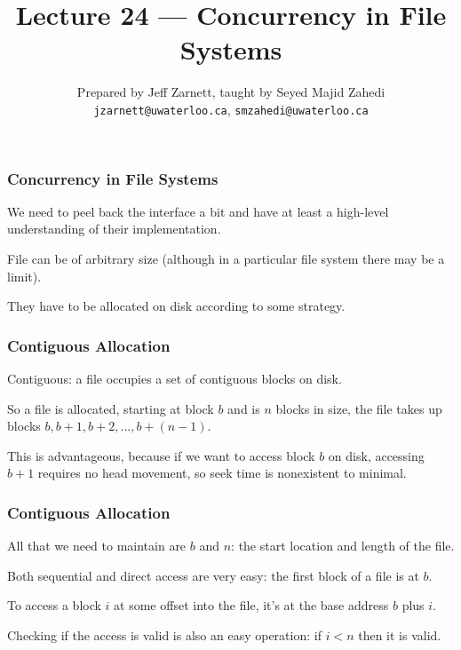 

\title{Lecture 24 --- Concurrency in File Systems }

\author{Prepared by Jeff Zarnett, taught by Seyed Majid Zahedi \\ \small \texttt{jzarnett@uwaterloo.ca}, \texttt{smzahedi@uwaterloo.ca}}

\date{}




\begin{frame}
	\titlepage

\end{frame}


\begin{frame}
	\frametitle{Concurrency in File Systems}

	We need to peel back the interface a bit and have at least a high-level understanding of their implementation.

	File can be of arbitrary size (although in a particular file system there may be a limit).

	They have to be allocated on disk according to some strategy.

\end{frame}

\begin{frame}
	\frametitle{Contiguous Allocation}
	Contiguous: a file occupies a set of contiguous blocks on disk.

	So a file is allocated, starting at block $b$ and is $n$ blocks in size, the file takes up blocks $b, b+1, b+2, ..., b+(n-1)$.

	This is advantageous, because if we want to access block $b$ on disk, accessing $b+1$ requires no head movement, so seek time is nonexistent to minimal.

\end{frame}

\begin{frame}
	\frametitle{Contiguous Allocation}

	All that we need to maintain are $b$ and $n$: the start location and length of the file.

	Both sequential and direct access are very easy: the first block of a file is at $b$.

	To access a block $i$ at some offset into the file, it's at the base address $b$ plus $i$.

	Checking if the access is valid is also an easy operation: if $i < n$ then it is valid.

\end{frame}

